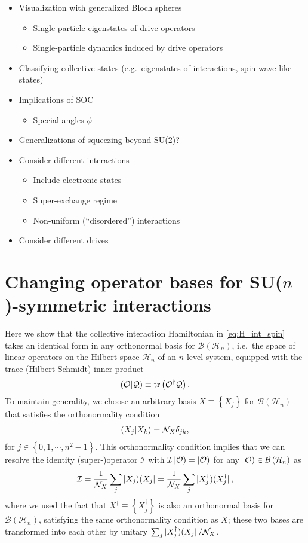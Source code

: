 \documentclass[nofootinbib,notitlepage,11pt]{revtex4-2}
\newcommand{\f}[2]{\dfrac{#1}{#2}} %
\newcommand{\p}[1]{\left(#1\right)} %
\renewcommand{\set}[1]{\left\{#1\right\}} %
\newcommand{\1}{\mathds{1}}
\newcommand{\B}{\mathcal{B}}
\renewcommand{\H}{\mathcal{H}}
\newcommand{\I}{\mathcal{I}}
\newcommand{\N}{\mathcal{N}}
\renewcommand{\O}{\mathcal{O}}
\newcommand{\Q}{\mathcal{Q}}
\def\obra#1{\mathinner{({#1}|}}
\def\oket#1{\mathinner{|{#1})}}
\def\obk#1{\mathinner{({#1})}}
\def\oop#1#2{\oket{#1}\!\obra{#2}}
\begin{document}
\begin{itemize}
\item Visualization with generalized Bloch spheres
  \begin{itemize}
  \item Single-particle eigenstates of drive operators
  \item Single-particle dynamics induced by drive operators
  \end{itemize}
\item Classifying collective states (e.g.~eigenstates of interactions,
  spin-wave-like states)
\item Implications of SOC
  \begin{itemize}
  \item Special angles $\phi$
  \end{itemize}
\item Generalizations of squeezing beyond SU(2)?
\item Consider different interactions
  \begin{itemize}
  \item Include electronic states
  \item Super-exchange regime
  \item Non-uniform (``disordered'') interactions
  \end{itemize}
\item Consider different drives
\end{itemize}

\appendix

\section{Changing operator bases for SU($n$)-symmetric interactions}
\label{sec:changing_bases}

Here we show that the collective interaction Hamiltonian in
\eqref{eq:H_int_spin} takes an identical form in any orthonormal basis
for $\B\p{\H_n}$, i.e.~the space of linear operators on the Hilbert
space $\H_n$ of an $n$-level system, equipped with the trace
(Hilbert-Schmidt) inner product
\begin{align}
  \obk{\O|\Q} \equiv \tr\p{\O^\dag \Q}.
\end{align}
To maintain generality, we choose an arbitrary basis
$X\equiv\set{X_j}$ for $\B\p{\H_n}$ that satisfies the orthonormality
condition
\begin{align}
  \obk{X_j|X_k} = \N_X \delta_{jk},
\end{align}
for $j\in\set{0,1,\cdots,n^2-1}$.  This orthonormality condition
implies that we can resolve the identity (super-)operator $\I$ with
$\I\oket{\O}=\oket{\O}$ for any $\oket\O\in\B\p{\H_n}$ as
\begin{align}
  \I = \f1{\N_X} \sum_j \oop{X_j}{X_j}
  = \f1{\N_X} \sum_j \oop{X_j^\dag}{X_j^\dag},
\end{align}
where we used the fact that $X^\dag\equiv\set{X_j^\dag}$ is also an
orthonormal basis for $\B\p{\H_n}$, satisfying the same orthonormality
condition as $X$; these two bases are transformed into each other by
unitary $\sum_j\oop{X_j^\dag}{X_j}/\N_X$.
\end{document}
